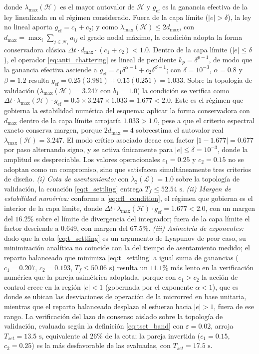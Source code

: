 donde $\lambda_{\max}(\mathcal{H})$ es el mayor autovalor de $\mathcal{H}$ y $g_{\text{ef}}$ es la ganancia efectiva de la ley linealizada en el régimen considerado. Fuera de la capa límite ($|e| > \delta$), la ley no lineal aporta $g_{\text{ef}} = c_1 + c_2$; y como $\lambda_{\max}(\mathcal{H}) \le 2d_{\max}$, con $d_{\max} = \max_{i} \sum_{j \in \mathcal{N}_i} a_{ij}$ el grado nodal máximo, la condición adopta la forma conservadora clásica $\Delta t \cdot d_{\max} \cdot (c_1 + c_2) < 1.0$. Dentro de la capa límite ($|e| \le \delta$), el operador \eqref{eq:anti_chattering} es lineal de pendiente $k_p = \delta^{p-1}$, de modo que la ganancia efectiva asciende a $g_{\text{ef}} = c_1\delta^{\alpha-1} + c_2\delta^{\beta-1}$; con $\delta = 10^{-3}$, $\alpha = 0.8$ y $\beta = 1.2$ resulta $g_{\text{ef}} = 0.25(3.981) + 0.15(0.251) = 1.033$. Sobre la topología de validación ($\lambda_{\max}(\mathcal{H}) = 3.247$ con $b_1 = 1.0$) la condición se verifica como $\Delta t \cdot \lambda_{\max}(\mathcal{H}) \cdot g_{\text{ef}} = 0.5 \times 3.247 \times 1.033 = 1.677 < 2.0$. Este es el régimen que gobierna la estabilidad numérica del esquema: aplicar la forma conservadora con $d_{\max}$ dentro de la capa límite arrojaría $1.033 > 1.0$, pese a que el criterio espectral exacto conserva margen, porque $2d_{\max} = 4$ sobreestima el autovalor real $\lambda_{\max}(\mathcal{H}) = 3.247$. El modo crítico asociado decae con factor $|1 - 1.677| = 0.677$ por paso alternando signo, y se activa únicamente para $|e| \le \delta = 10^{-3}$, donde la amplitud es despreciable. Los valores operacionales $c_1 = 0.25$ y $c_2 = 0.15$ no se adoptan como un compromiso, sino que satisfacen simultáneamente tres criterios de diseño. \emph{(i) Cota de asentamiento:} con $\lambda_2(\mathcal{L}) = 1.0$ sobre la topología de validación, la ecuación \eqref{eq:t_settling} entrega $T_f \le 52.54\text{ s}$. \emph{(ii) Margen de estabilidad numérica:} conforme a \eqref{eq:cfl_condition}, el régimen que gobierna es el interior de la capa límite, donde $\Delta t \cdot \lambda_{\max}(\mathcal{H}) \cdot g_{\text{ef}} = 1.677 < 2.0$, con un margen del $16.2\%$ sobre el límite de divergencia del integrador; fuera de la capa límite el factor desciende a $0.649$, con margen del $67.5\%$. \emph{(iii) Asimetría de exponentes:} dado que la cota \eqref{eq:t_settling} es un argumento de Lyapunov de peor caso, su minimización analítica no coincide con la del tiempo de asentamiento medido; el reparto balanceado que minimiza \eqref{eq:t_settling} a igual suma de ganancias ($c_1 = 0.207$, $c_2 = 0.193$, $T_f \le 50.06\text{ s}$) resulta un $11.1\%$ más lento en la verificación numérica que la pareja asimétrica adoptada, porque con $c_1 > c_2$ la acción de control crece en la región $|e| < 1$ (gobernada por el exponente $\alpha < 1$), que es donde se ubican las desviaciones de operación de la microrred en base unitaria, mientras que el reparto balanceado desplaza el esfuerzo hacia $|e| > 1$, fuera de ese rango. La verificación del lazo de consenso aislado sobre la topología de validación, evaluada según la definición \eqref{eq:tset_band} con $\varepsilon = 0.02$, arroja $T_{set} = 13.5\text{ s}$, equivalente al $26\%$ de la cota; la pareja invertida ($c_1 = 0.15$, $c_2 = 0.25$) es la más desfavorable de las evaluadas, con $T_{set} = 17.5\text{ s}$.


